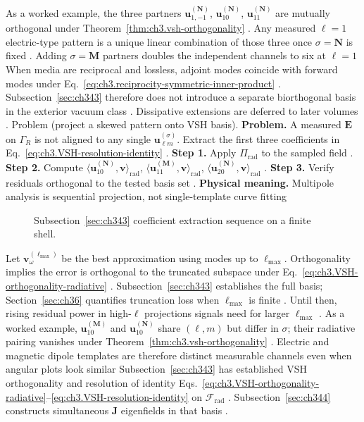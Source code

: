As a worked example, the three partners \(\mathbf{u}_{1,-1}^{(\mathbf{N})}\), \(\mathbf{u}_{10}^{(\mathbf{N})}\), \(\mathbf{u}_{11}^{(\mathbf{N})}\)
are mutually orthogonal under Theorem~\ref{thm:ch3.vsh-orthogonality} . Any measured
\(\ell=1\) electric-type pattern is a unique linear combination of those three once \(\sigma=\mathbf{N}\) is fixed
. Adding \(\sigma=\mathbf{M}\) partners doubles the independent channels to six at \(\ell=1\)
When media are reciprocal and lossless, adjoint modes coincide with forward modes under
Eq.~\eqref{eq:ch3.reciprocity-symmetric-inner-product} . Subsection~\ref{sec:ch343}
therefore does not introduce a separate biorthogonal basis in the exterior vacuum class . Dissipative
extensions are deferred to later volumes .
Problem (project a skewed pattern onto VSH basis). \textbf{Problem.} A measured \(\mathbf{E}\) on \(\Gamma_R\) is not aligned to any single \(\mathbf{u}_{\ell m}^{(\sigma)}\).
Extract the first three coefficients in Eq.~\eqref{eq:ch3.VSH-resolution-identity} .
\textbf{Step 1.} Apply \(\Pi_{\mathrm{rad}}\) to the sampled field .
\textbf{Step 2.} Compute \(\langle\mathbf{u}_{10}^{(\mathbf{N})},\mathbf{v}\rangle_{\mathrm{rad}}\),
\(\langle\mathbf{u}_{11}^{(\mathbf{M})},\mathbf{v}\rangle_{\mathrm{rad}}\),
\(\langle\mathbf{u}_{20}^{(\mathbf{N})},\mathbf{v}\rangle_{\mathrm{rad}}\) .
\textbf{Step 3.} Verify residuals orthogonal to the tested basis set .
\textbf{Physical meaning.} Multipole analysis is sequential projection, not single-template curve fitting
\begin{figure}[t]
\centering
{}
\caption{Subsection~\ref{sec:ch343} coefficient extraction sequence on a finite shell.}
\label{fig:ch3.343-extraction-pipeline}
\end{figure}
Let \(\mathbf{v}_\omega^{(\ell_{\max})}\) be the best approximation using modes up to \(\ell_{\max}\). Orthogonality
implies the error is orthogonal to the truncated subspace under Eq.~\eqref{eq:ch3.VSH-orthogonality-radiative}
. Subsection~\ref{sec:ch343} establishes the full basis; Section~\ref{sec:ch36} quantifies
truncation loss when \(\ell_{\max}\) is finite . Until then, rising residual power
in high-\(\ell\) projections signals need for larger \(\ell_{\max}\) .
As a worked example, \(\mathbf{u}_{10}^{(\mathbf{M})}\) and \(\mathbf{u}_{10}^{(\mathbf{N})}\) share \((\ell,m)\) but differ in \(\sigma\); their
radiative pairing vanishes under Theorem~\ref{thm:ch3.vsh-orthogonality} .
Electric and magnetic dipole templates are therefore distinct measurable channels even when angular plots look similar
Subsection~\ref{sec:ch343} has established VSH orthogonality and resolution of identity
Eqs.~\eqref{eq:ch3.VSH-orthogonality-radiative}--\eqref{eq:ch3.VSH-resolution-identity} on
\(\mathcal{F}_{\mathrm{rad}}\) . Subsection~\ref{sec:ch344} constructs simultaneous
\(\mathbf{J}\) eigenfields in that basis .
